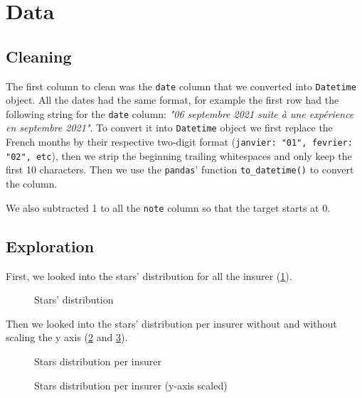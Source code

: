 \documentclass[a4paper, 12pt, one column]{article}
\begin{document}

\newpage


\section{Data}

\subsection{Cleaning}

The first column to clean was the \lstinline{date} column that we converted into \lstinline{Datetime} object.
All the dates had the same format, for example the first row had the following string for the \lstinline{date} column: \textit{"06 septembre 2021 suite à une expérience en septembre 2021"}. 
To convert it into \lstinline[language=python]{Datetime} object we first replace the French months by their respective two-digit format (\lstinline{janvier: "01", fevrier: "02", etc}), then we strip the beginning trailing whitespaces and only keep the first 10 characters. Then we use the \lstinline{pandas}’ function \lstinline{to_datetime()} to convert the column. 

We also subtracted 1 to all the \lstinline{note} column so that the target starts at 0. 

\subsection{Exploration}

First, we looked into the stars’ distribution for all the insurer (\cref{fig:distrib}).

\begin{figure}[H]
    \centering
    
    \caption{Stars' distribution}
    \label{fig:distrib}
\end{figure}

Then we looked into the stars’ distribution per insurer without and without scaling the y axis (\cref{fig:distrib_split_noscale} and \cref{fig:distrib_split_scale}).

\begin{figure}[H]
    \advance\leftskip-3cm
    
    \caption{Stars distribution per insurer}
    \label{fig:distrib_split_noscale}
\end{figure}


\begin{figure}[H]
    \advance\leftskip-3cm
    
    \caption{Stars distribution per insurer (y-axis scaled)}
    \label{fig:distrib_split_scale}
\end{figure}
\end{document}
